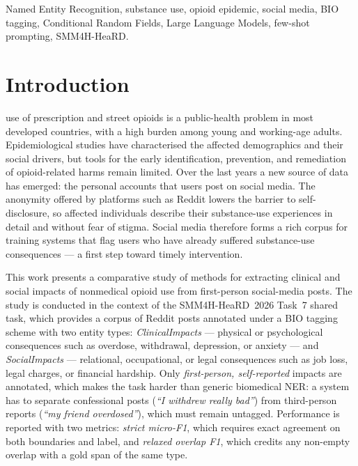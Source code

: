\documentclass[journal]{IEEEtran}
\begin{document}
\begin{IEEEkeywords}
Named Entity Recognition, substance use, opioid epidemic, social media,
BIO tagging, Conditional Random Fields, Large Language Models, few-shot
prompting, SMM4H-HeaRD.
\end{IEEEkeywords}






%
\IEEEpeerreviewmaketitle



\section{Introduction}
\label{sec:introduction}
 use of prescription and street opioids is a
public-health problem in most developed countries, with a high burden
among young and working-age adults. Epidemiological studies have
characterised the affected demographics and their social drivers, but
tools for the early identification, prevention, and remediation of
opioid-related harms remain limited. Over the last years a new
source of data has emerged: the personal accounts that users post on
social media. The anonymity offered by platforms such as Reddit lowers
the barrier to self-disclosure, so affected individuals describe their
substance-use experiences in detail and without fear of stigma. Social
media therefore forms a rich corpus for training systems that flag
users who have already suffered substance-use consequences --- a first
step toward timely intervention.

This work presents a comparative study of methods for extracting
clinical and social impacts of nonmedical opioid use from first-person
social-media posts. The study is conducted in the context of the
SMM4H-HeaRD~2026 Task~7 shared task, which provides a corpus of
Reddit posts annotated under a BIO tagging scheme with two entity
types: \emph{ClinicalImpacts} --- physical or psychological
consequences such as overdose, withdrawal, depression, or anxiety ---
and \emph{SocialImpacts} --- relational, occupational, or legal
consequences such as job loss, legal charges, or financial hardship.
Only \emph{first-person, self-reported} impacts are annotated, which
makes the task harder than generic biomedical NER: a system has to
separate confessional posts (\emph{``I withdrew really bad''}) from
third-person reports (\emph{``my friend overdosed''}), which must
remain untagged. Performance is reported with two metrics:
\emph{strict micro-F1}, which requires exact agreement on both
boundaries and label, and \emph{relaxed overlap F1}, which credits any
non-empty overlap with a gold span of the same type.
\end{document}
